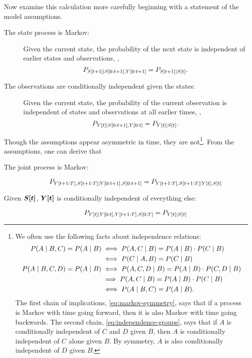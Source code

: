 Now examine this calculation more carefully beginning with a statement
of the model assumptions.
\begin{description}
\item[The state process is Markov:] Given the current state, the
  probability of the next state is independent of earlier states and
  observations, \ie,
  \begin{equation}
    \label{eq:assume_markov}
    P_{\ti{S}{t+1}\given \ts{S}{0}{t+1},\ts{Y}{0}{t+1}} = %
        P_{\ti{S}{t+1}\given \ti{S}{t}}.
  \end{equation}
\item[The observations are conditionally independent given the states:]
  Given the current state, the probability of the current observation is
  independent of states and observations at all earlier times, \ie,
  \begin{equation}
    \label{eq:assume_output}
    P_{\ti{Y}{t}\given \ts{S}{0}{t+1},\ts{Y}{0}{t}} = %
        P_{\ti{Y}{t}\given \ti{S}{t}}.
  \end{equation}
\end{description}
Though the assumptions appear asymmetric in time, they are
not\footnote{We often use the following facts about independence
  relations:
  \begin{align}
    P(A\given B,C) = P(A\given B)   &\iff     P(A,C\given B) = P(A\given B) \cdot P(C\given B)\nonumber\\
    \label{eq:markov-symmetry}%
                        &\iff     P(C\given A,B) = P(C\given B)\\
    P(A\given B,C,D) = P(A\given B) &\iff     P(A,C,D\given B) = P(A\given B) \cdot P(C,D\given B)\nonumber\\
                        &\implies P(A,C\given B) = P(A\given B) \cdot P(C\given B)\nonumber\\
    \label{eq:independence-groups}%
                        &\iff     P(A\given B,C) = P(A\given B).
  \end{align}
  The first chain of implications, \eqref{eq:markov-symmetry}, says
  that if a process is Markov with time going forward, then it is also
  Markov with time going backwards.  The second chain,
  \eqref{eq:independence-groups}, says that if $A$ is conditionally
  independent of $C$ and $D$ given $B$, then $A$ is conditionally
  independent of $C$ alone given $B$.  By symmetry, $A$ is also
  conditionally independent of $D$ given $B$.}.  From the assumptions,
one can derive that
\begin{description}
\item[The joint process is Markov:] 
  \begin{equation*}
    P_{Y[t+1:T],S[t+1:T]\mid Y[0:t+1],S[0:t+1]}
      = P_{Y[t+1:T],S[t+1:T]\mid {Y}{[t]},{S}{[t]}}
  \end{equation*}
\item[Given $\bm{{S}{[t]}}$, $\bm{{Y}{[t]}}$ is conditionally independent of everything else:]
  \begin{equation*}
    P_{{Y}{[t]} \mid Y[0:t],Y[t+1:T], S[0:T]} = P_{{Y}{[t]} \mid {S}{[t]}}
  \end{equation*}
\end{description}
